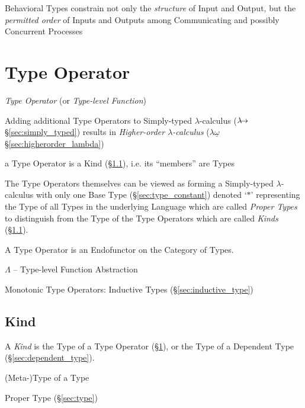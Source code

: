 Behavioral Types constrain not only the \emph{structure} of Input and Output,
but the \emph{permitted order} of Inputs and Outputs among Communicating and
possibly Concurrent Processes



\section{Type Operator}\label{sec:type_operator}

\emph{Type Operator} (or \emph{Type-level Function})

Adding additional Type Operators to Simply-typed $\lambda$-calculus
($\lambda\kern-5pt\rightarrow$ \S\ref{sec:simply_typed}) results in
\emph{Higher-order $\lambda$-calculus} ($\lambda\underline{\omega}$
\S\ref{sec:higherorder_lambda})

a Type Operator is a Kind (\S\ref{sec:kind}), i.e. its ``members'' are
Types

The Type Operators themselves can be viewed as forming a Simply-typed
$\lambda$-calculus with only one Base Type (\S\ref{sec:type_constant})
denoted `$\ast$' representing the Type of all Types in the underlying
Language which are called \emph{Proper Types} to distinguish from the
Type of the Type Operators which are called \emph{Kinds}
(\S\ref{sec:kind}).

A Type Operator is an Endofunctor on the Category of Types.

$\Lambda$ -- Type-level Function Abstraction

Monotonic Type Operators: Inductive Types (\S\ref{sec:inductive_type})



\subsection{Kind}\label{sec:kind}

A \emph{Kind} is the Type of a Type Operator
(\S\ref{sec:type_operator}), or the Type of a Dependent Type
(\S\ref{sec:dependent_type}).

(Meta-)Type of a Type

\fist Proper Type (\S\ref{sec:type})

